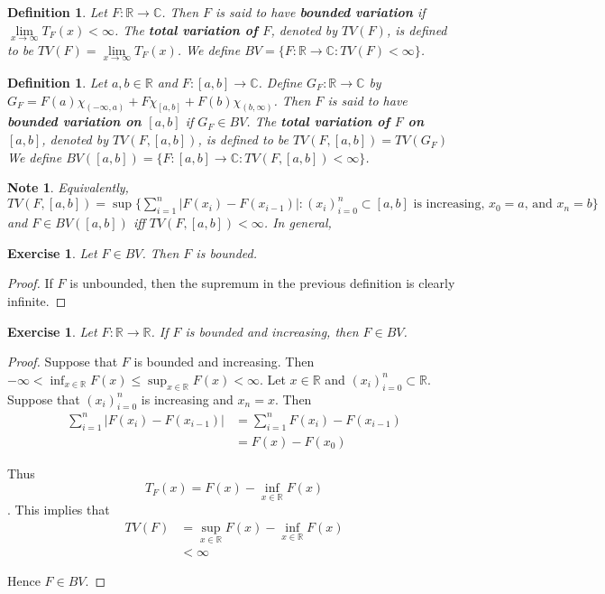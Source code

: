 \documentclass[12pt]{amsart}
\newtheorem{defn}[thm]{Definition}
\newtheorem{note}[thm]{Note}
\newtheorem{ex}[thm]{Exercise}
\newcommand{\C}{\mathbb{C}}
\newcommand{\R}{\mathbb{R}}
\begin{document}
\begin{defn}
	Let $F:\R \rightarrow \C$. Then $F$ is said to have \textbf{bounded variation} if $\lim \limits_{x \rightarrow \infty}T_F(x)<\infty$. The \textbf{total variation of $F$}, denoted by $TV(F)$, is defined to be $TV(F) = \lim\limits_{x\rightarrow \infty}T_F(x)$.
	We define $BV = \{F:\R \rightarrow \C: TV(F)<\infty \}$.
\end{defn}

\begin{defn}
	Let $a,b \in \R$ and $F:[a,b] \rightarrow \C$. Define $G_F:\R \rightarrow \C$ by $G_F = F(a)\chi_{(-\infty,a)} + F\chi_{[a,b]}+F(b)\chi_{(b,\infty)}$. Then $F$ is said to have \textbf{bounded variation on $[a,b]$} if $G_F \in BV$. The \textbf{total variation of $F$ on $[a,b]$}, denoted by $TV(F, [a,b])$, is defined to be $TV(F, [a,b]) = TV(G_F)$ We define $BV([a,b]) = \{F:[a,b] \rightarrow \C: TV(F, [a,b]) < \infty\}$.
\end{defn}

\begin{note}
	Equivalently, $TV(F, [a,b]) = \sup \big \{\sum_{i=1}^{n}|F(x_{i}) - F(x_{i-1})|: (x_i)_{i=0}^n \subset [a,b] \text{ is increasing, } x_0=a \text{, and } x_n=b\big \}$ and $F \in BV([a,b])$ iff $TV(F, [a,b]) < \infty$. In general, 
\end{note}

\begin{ex}
	Let $F \in BV$. Then $F$ is bounded.
\end{ex}

\begin{proof}
	If $F$ is unbounded, then the supremum in the previous definition is clearly infinite.
\end{proof}

\begin{ex}
	Let $F:\R \rightarrow \R$. If $F$ is bounded and increasing, then $F \in BV$.
\end{ex}

\begin{proof}
	Suppose that $F$ is bounded and increasing. Then $-\infty<\inf_{x \in \R}F(x) \leq \sup_{x \in \R}F(x)<\infty$. Let $x \in \R$ and $(x_i)_{i=0}^n \subset \R$. Suppose that $(x_i)_{i=0}^n$ is increasing and $x_n=x$. Then 
	\begin{align*}
		\sum_{i=1}^n|F(x_i)-F(x_{i-1})| 
		&= \sum_{i=1}^n F(x_i)-F(x_{i-1})\\
		&= F(x)-F(x_0)
	\end{align*}
	
	Thus $$T_F(x) = F(x)-\inf_{x \in \R}F(x)$$. This implies that 
	\begin{align*}
		TV(F) 
		&= \sup_{x \in \R}F(x)-\inf_{x \in \R}F(x)\\
		&<\infty
	\end{align*}
	
	Hence $F \in BV$.
\end{proof}
\end{document}
